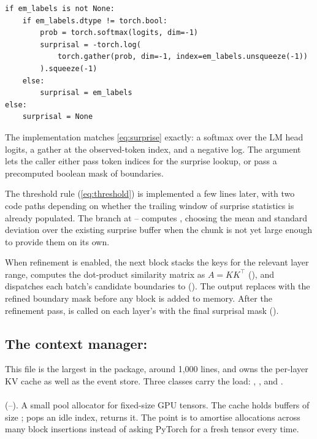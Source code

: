 \begin{lstlisting}[caption={Surprise computation. \file{em\_llm/attention/em\_llm.py:197}--\file{em\_llm.py:205}.},captionpos=b]
if em_labels is not None:
    if em_labels.dtype != torch.bool:
        prob = torch.softmax(logits, dim=-1)
        surprisal = -torch.log(
            torch.gather(prob, dim=-1, index=em_labels.unsqueeze(-1))
        ).squeeze(-1)
    else:
        surprisal = em_labels
else:
    surprisal = None
\end{lstlisting}

The implementation matches \cref{eq:surprise} exactly: a softmax over the LM head logits, a gather at the observed-token index, and a negative log. The  argument lets the caller either pass token indices for the surprise lookup, or pass a precomputed boolean mask of boundaries.

The threshold rule (\cref{eq:threshold}) is implemented a few lines later, with two code paths depending on whether the trailing window of surprise statistics is already populated. The branch at -- computes , choosing the mean and standard deviation over the existing surprise buffer when the chunk is not yet large enough to provide them on its own.

When refinement is enabled, the next block stacks the keys for the relevant layer range, computes the dot-product similarity matrix as $A = K K^\top$ (), and dispatches each batch's candidate boundaries to  (). The output replaces  with the refined boundary mask before any block is added to memory. After the refinement pass,  is called on each layer's  with the final surprisal mask ().

\subsection{The context manager: }
\label{sec:walkthrough-context-manager}

This file is the largest in the package, around 1{,}000 lines, and owns the per-layer KV cache as well as the event store. Three classes carry the load: , , and .

\paragraph{} (--). A small pool allocator for fixed-size GPU tensors. The cache holds  buffers of size ;  pops an idle index,  returns it. The point is to amortise allocations across many block insertions instead of asking PyTorch for a fresh tensor every time.

